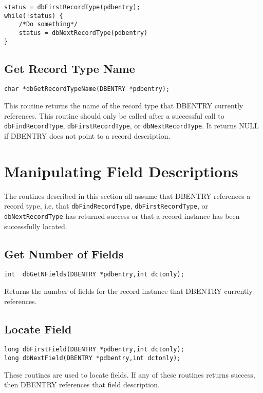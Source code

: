 \begin{verbatim}status = dbFirstRecordType(pdbentry);
while(!status) {
    /*Do something*/
    status = dbNextRecordType(pdbentry)
}
\end{verbatim}\subsection{Get Record Type Name}

\begin{verbatim}char *dbGetRecordTypeName(DBENTRY *pdbentry);
\end{verbatim}This routine returns the name of the record type that DBENTRY currently references. This routine should only be called 
after a successful call to \verb|dbFindRecordType|, \verb|dbFirstRecordType|, or \verb|dbNextRecordType|. It returns NULL if 
DBENTRY does not point to a record description.

\section{Manipulating Field Descriptions}

The routines described in this section all assume that DBENTRY references a record type, i.e. that 
\verb|dbFindRecordType|, \verb|dbFirstRecordType|, or \verb|dbNextRecordType| has returned success or that a record instance 
has been successfully located.

\subsection{Get Number of Fields}

\begin{verbatim}int  dbGetNFields(DBENTRY *pdbentry,int dctonly);
\end{verbatim}Returns the number of fields for the record instance that DBENTRY currently references.

\subsection{Locate Field}

\begin{verbatim}long dbFirstField(DBENTRY *pdbentry,int dctonly);
long dbNextField(DBENTRY *pdbentry,int dctonly);
\end{verbatim}
These routines are used to locate fields. If any of these routines returns success, then DBENTRY references that field 
description. 

